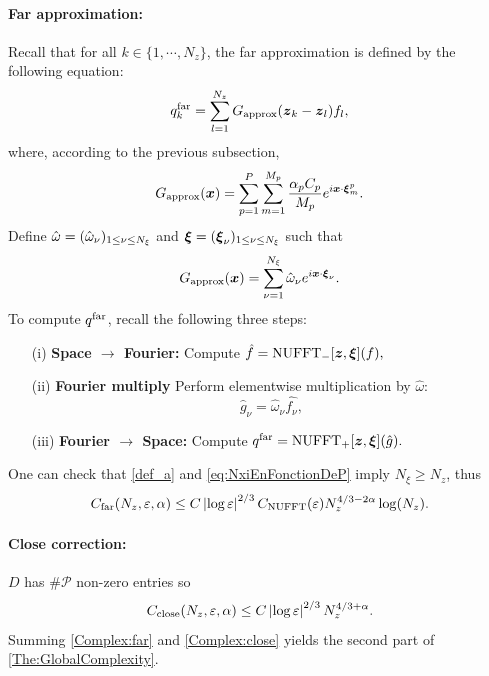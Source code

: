 \documentclass{article}
\begin{document}
\paragraph{Far approximation:} Recall that for all $k \in \{1,\cdots,N_z\}$, the far approximation is defined by the following equation:
\[ q^{\text{far}}_k = \sum_{l=1}^{N_z} G_{\textup{approx}}(\boldsymbol{z}_k - \boldsymbol{z}_l) f_l,\]
where, according to the previous subsection,
\[G_{\textup{approx}}(\boldsymbol{x}) = \sum_{p=1}^P\sum_{m = 1}^{M_p} \dfrac{\alpha_pC_p}{M_p}e^{i \boldsymbol{x}\cdot \boldsymbol{\xi}^p_m}.\]
Define $\hat{\omega} = (\hat{\omega}_{\nu})_{1 \leq \nu \leq N_\xi}$ and $\boldsymbol{\xi} = (\boldsymbol{\xi}_{\nu})_{1 \leq \nu \leq N_\xi}$ such that
\[ G_{\textup{approx}}(\boldsymbol{x}) = \sum_{\nu=1}^{N_\xi} \hat{\omega}_\nu e^{i \boldsymbol{x} \cdot \boldsymbol{\xi}_\nu}.\]
To compute $q^{\textup{far}}$, recall the following three steps:
\begin{itemize}
	\item[(i)] \textbf{Space $\rightarrow$ Fourier: } Compute $\hat{f} = \textup{NUFFT}_-[\boldsymbol{z},\boldsymbol{\xi}](f),$
	\item[(ii)] \textbf{Fourier multiply} Perform elementwise multiplication by $\hat{\omega}$: 
	\[\hat{g}_{\nu} = \hat{\omega}_\nu \hat{f_\nu},\]
	\item[(iii)] \textbf{Fourier $\rightarrow$ Space: } Compute $q^{\text{far}} =  \textup{NUFFT}_+[\boldsymbol{z},\boldsymbol{\xi}](\hat{g}).$
\end{itemize}
One can check that \eqref{def_a} and \eqref{eq:NxiEnFonctionDeP} imply $N_{\xi} \geq N_z$, thus
\begin{equation}
	\label{Complex:far}
	C_{\textup{far}}(N_z,\varepsilon,\alpha) \leq C 	\left\lvert \log \varepsilon \right\rvert^{2/3} C_{\textup{NUFFT}}(\varepsilon) N_z^{4/3 - 2\alpha } \log(N_z).
\end{equation}
\paragraph{Close correction:} $D$ has $\# \mathcal{P}$ non-zero entries so 
\begin{equation}
	\label{Complex:close}
	C_{\textup{close}}(N_z,\varepsilon,\alpha) \leq C \left\lvert \log\varepsilon \right\rvert^{2/3}N_z^{4/3 + \alpha}.
\end{equation}
Summing \eqref{Complex:far} and \eqref{Complex:close} yields the second part of \autoref{The:GlobalComplexity}. 
																																																		
\end{document}
